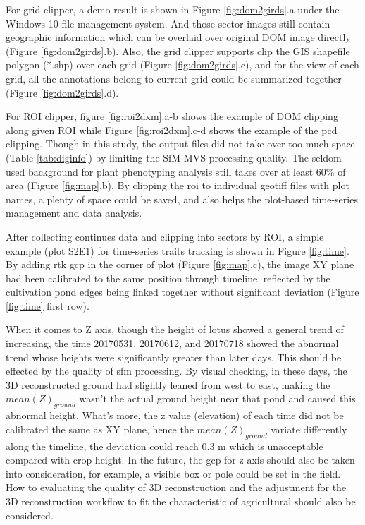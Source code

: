 \documentclass[doublespacing]{configs/bmcart}
\begin{document}
For grid clipper, a demo result is shown in Figure \ref{fig:dom2girds}.a under the Windows 10 file management system. And those sector images still contain geographic information which can be overlaid over original DOM image directly (Figure \ref{fig:dom2girds}.b). Also, the grid clipper supports clip the GIS shapefile polygon (*.shp) over each grid (Figure \ref{fig:dom2girds}.c), and for the view of each grid, all the annotations belong to current grid could be summarized together (Figure \ref{fig:dom2girds}.d).

For ROI clipper, figure \ref{fig:roi2dxm}.a-b shows the example of DOM clipping along given ROI while Figure \ref{fig:roi2dxm}.c-d shows the example of the \acrshort*{pcd} clipping. Though in this study, the output files did not take over too much space (Table \ref{tab:diginfo}) by limiting the SfM-MVS processing quality. The seldom used background for plant phenotyping analysis still takes over at least 60\% of area (Figure \ref{fig:map}.b). By clipping the \acrshort*{roi} to individual geotiff files with plot names, a plenty of space could be saved, and also helps the plot-based time-series management and data analysis. 

After collecting continues data and clipping into sectors by ROI, a simple example (plot S2E1) for time-series traits tracking is shown in Figure \ref{fig:time}. By adding \acrfull*{rtk} \acrshort*{gcp} in the corner of plot (Figure \ref{fig:map}.c), the image XY plane had been calibrated to the same position through timeline, reflected by the cultivation pond edges being linked together without significant deviation (Figure \ref{fig:time} first row). 

When it comes to Z axis, though the height of lotus showed a general trend of increasing, the time 20170531, 20170612, and 20170718 showed the abnormal trend whose heights were significantly greater than later days. This should be effected by the quality of \acrshort*{sfm} processing. By visual checking, in these days, the 3D reconstructed ground had slightly leaned from west to east, making the $mean(Z)_{ground}$ wasn't the actual ground height near that pond and caused this abnormal height. What's more, the z value (elevation) of each time did not be calibrated the same as XY plane, hence the $mean(Z)_{ground}$ variate differently along the timeline, the deviation could reach 0.3 m which is unacceptable compared with crop height. In the future, the \acrshort*{gcp} for z axis should also be taken into consideration, for example, a visible box or pole could be set in the field. How to evaluating the quality of 3D reconstruction and the adjustment for the 3D reconstruction workflow to fit the characteristic of agricultural should also be considered.
\end{document}
